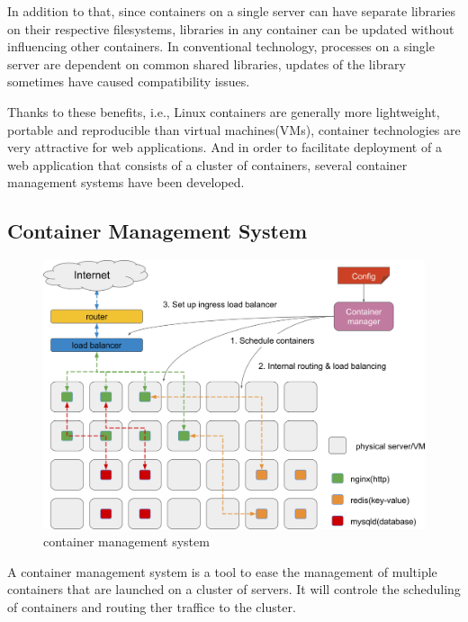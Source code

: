 In addition to that, since containers on a single server can have separate libraries on their respective filesystems, libraries in any container can be updated without influencing other containers.
In conventional technology, processes on a single server are dependent on common shared libraries, updates of the library sometimes have caused compatibility issues.

Thanks to these benefits, i.e., Linux containers are generally more lightweight, portable and reproducible than virtual machines(VMs), container technologies are very attractive for web applications.
And in order to facilitate deployment of a web application that consists of a cluster of containers, several container management systems have been developed.

\subsection{Container Management System}

\begin{figure}[h]
\begin{center}
\includegraphics[width=0.9\columnwidth]{Figs/container_management_system}
\end{center}
\caption{
container management system
}

\label{fig:container_management_system}
\end{figure}



A container management system is a tool to ease the management of multiple containers that are launched on a cluster of servers.
It will controle the scheduling of containers and routing ther traffice to the cluster.


